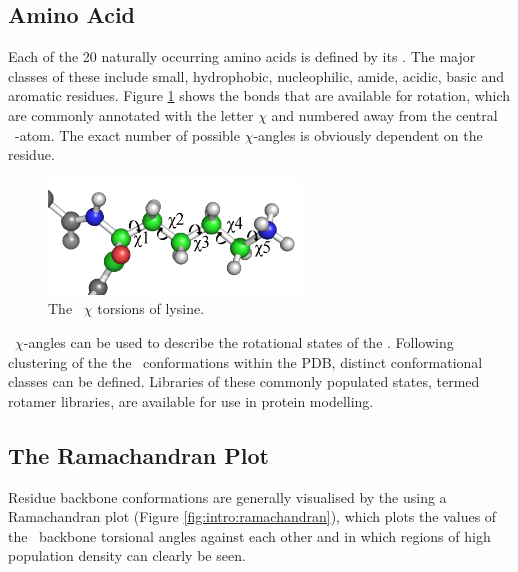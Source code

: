 \subsection{Amino Acid  \Sidechains}

Each of the 20 naturally occurring amino acids is defined by its  \sidechain. The major classes of these include   small, hydrophobic, nucleophilic, amide,
acidic, basic and aromatic residues. Figure \ref{fig:intro:chi} shows the bonds that are available for rotation, which are commonly annotated with the letter $\chi$ and numbered
away from the central \mainchain\ \ca-atom. The exact number of possible $\chi$-angles is obviously dependent on the residue. 


\begin{figure}[hptb]
\begin{center}
\includegraphics[width=0.6\textwidth]{01-ProteinStructure/sidechain/chi.png}
\caption{The \sidechain\ $\chi$ torsions of lysine.}
\label{fig:intro:chi}
\end{center}
\end{figure}

\Sidechain\ $\chi$-angles can be used to describe the rotational states  of the \sidechain. Following clustering of the the \sidechain\ conformations within the PDB, distinct conformational classes can be defined. Libraries of these commonly populated states, termed rotamer libraries\cite{NATIVE:Kan93,NATIVE:Dun97,NATIVE:Shetty2003}, are available for use in protein modelling.


\subsection{The Ramachandran Plot}
\label{section:intro:ramachandran}

Residue backbone conformations are generally visualised by the using a Ramachandran plot\cite{NATIVE:Ramachandran1963,NATIVE:Ramachandran1968} (Figure \ref{fig:intro:ramachandran}), which plots the values of the \phipsi\ backbone torsional angles against each other and in which regions of high population density can clearly be seen. 

